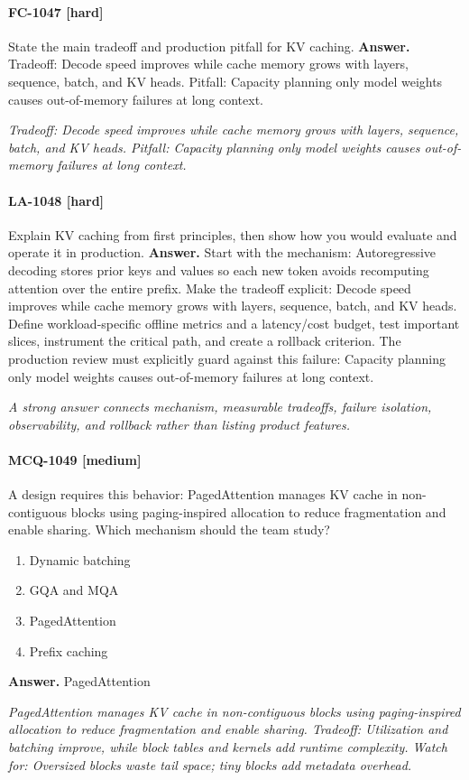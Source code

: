 \paragraph{FC-1047 [hard]} State the main tradeoff and production pitfall for KV caching.
\noindent\textbf{Answer.} Tradeoff: Decode speed improves while cache memory grows with layers, sequence, batch, and KV heads. Pitfall: Capacity planning only model weights causes out-of-memory failures at long context.
\par\textit{Tradeoff: Decode speed improves while cache memory grows with layers, sequence, batch, and KV heads. Pitfall: Capacity planning only model weights causes out-of-memory failures at long context.}
\paragraph{LA-1048 [hard]} Explain KV caching from first principles, then show how you would evaluate and operate it in production.
\noindent\textbf{Answer.} Start with the mechanism: Autoregressive decoding stores prior keys and values so each new token avoids recomputing attention over the entire prefix. Make the tradeoff explicit: Decode speed improves while cache memory grows with layers, sequence, batch, and KV heads. Define workload-specific offline metrics and a latency/cost budget, test important slices, instrument the critical path, and create a rollback criterion. The production review must explicitly guard against this failure: Capacity planning only model weights causes out-of-memory failures at long context.
\par\textit{A strong answer connects mechanism, measurable tradeoffs, failure isolation, observability, and rollback rather than listing product features.}
\paragraph{MCQ-1049 [medium]} A design requires this behavior: PagedAttention manages KV cache in non-contiguous blocks using paging-inspired allocation to reduce fragmentation and enable sharing. Which mechanism should the team study?
\begin{enumerate}[label=\Alph*.]
\item Dynamic batching
\item GQA and MQA
\item PagedAttention
\item Prefix caching
\end{enumerate}
\noindent\textbf{Answer.} PagedAttention
\par\textit{PagedAttention manages KV cache in non-contiguous blocks using paging-inspired allocation to reduce fragmentation and enable sharing. Tradeoff: Utilization and batching improve, while block tables and kernels add runtime complexity. Watch for: Oversized blocks waste tail space; tiny blocks add metadata overhead.}
